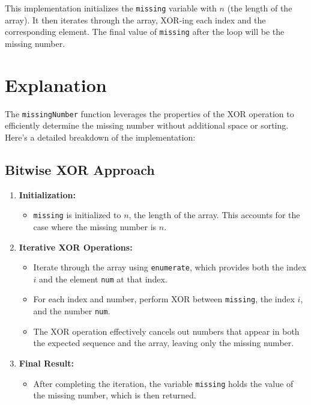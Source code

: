 This implementation initializes the \texttt{missing} variable with \(n\) (the length of the array). It then iterates through the array, XOR-ing each index and the corresponding element. The final value of \texttt{missing} after the loop will be the missing number.

\section*{Explanation}

The \texttt{missingNumber} function leverages the properties of the XOR operation to efficiently determine the missing number without additional space or sorting. Here's a detailed breakdown of the implementation:

\subsection*{Bitwise XOR Approach}

\begin{enumerate}
    \item \textbf{Initialization:}
    \begin{itemize}
        \item \texttt{missing} is initialized to \(n\), the length of the array. This accounts for the case where the missing number is \(n\).
    \end{itemize}
    
    \item \textbf{Iterative XOR Operations:}
    \begin{itemize}
        \item Iterate through the array using \texttt{enumerate}, which provides both the index \(i\) and the element \texttt{num} at that index.
        \item For each index and number, perform XOR between \texttt{missing}, the index \(i\), and the number \texttt{num}.
        \item The XOR operation effectively cancels out numbers that appear in both the expected sequence and the array, leaving only the missing number.
    \end{itemize}
    
    \item \textbf{Final Result:}
    \begin{itemize}
        \item After completing the iteration, the variable \texttt{missing} holds the value of the missing number, which is then returned.
    \end{itemize}
\end{enumerate}

